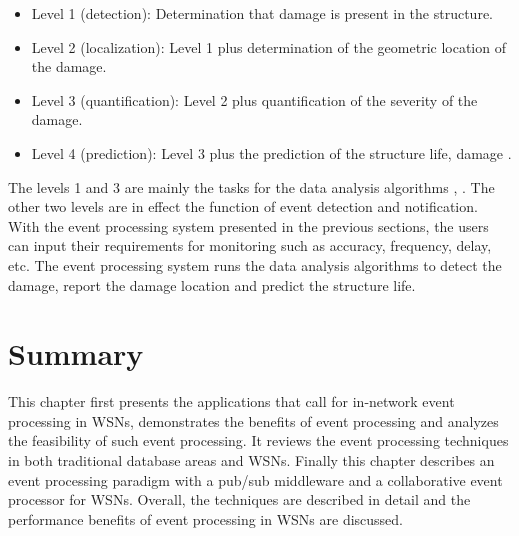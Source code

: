 \documentclass[12pt,journal,draftcls,letterpaper,onecolumn]{elsarticle}
\begin{document}
\begin{itemize}
    \item     Level 1 (detection): Determination that damage is present in the structure.
    \item     Level 2 (localization): Level 1 plus determination of the geometric location of the damage.
    \item     Level 3 (quantification): Level 2 plus quantification of the severity of the damage.
    \item     Level 4 (prediction): Level 3 plus the prediction of the structure life, damage .
\end{itemize}

The levels 1 and 3 are mainly the tasks for the data analysis
algorithms \cite{1475888}, \cite{1507526}. The other two levels are
in effect the function of event detection and notification. With the
event processing system presented in the previous sections, the
users can input their requirements for monitoring such as accuracy,
frequency, delay, etc. The event processing system runs the data
analysis algorithms to detect the damage, report the damage location
and predict the structure life.


\section{Summary}

This chapter first presents the applications that call for
in-network event processing in WSNs, demonstrates the benefits of
event processing and analyzes the feasibility of such event
processing. It reviews the event processing techniques in both
traditional database areas and WSNs. Finally this chapter describes
an event processing paradigm with a pub/sub middleware and a
collaborative event processor for WSNs. Overall, the techniques are
described in detail and the performance benefits of event processing
in WSNs are discussed.




\end{document}
